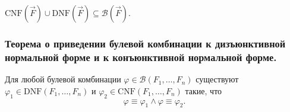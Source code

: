 \documentclass[a4paper, fleqn]{article}
\begin{document}
    \begin{corollary}
        $\text{CNF}\left(\vec{F}\right) \cup \text{DNF}\left(\vec{F}\right) 
        \subseteq \mathcal{B}\left(\vec{F}\right)$.
    \end{corollary}

    \subsubsection{Теорема о приведении булевой комбинации к дизъюнктивной нормальной форме и к конъюнктивной нормальной форме.}

    \begin{theorem}
        Для любой булевой комбинации $\varphi \in \mathcal{B}(F_{1}, \ldots, F_{n})$ существуют 
        $\varphi_{1} \in \text{DNF}(F_{1}, \ldots, F_{n})$ и $\varphi_{2} \in 
        \text{CNF}(F_{1}, \ldots, F_{n})$ такие, что
        \[
            \varphi \equiv \varphi_{1} \land \varphi \equiv \varphi_{2}.
        \]
    \end{theorem}
  
\end{document}
